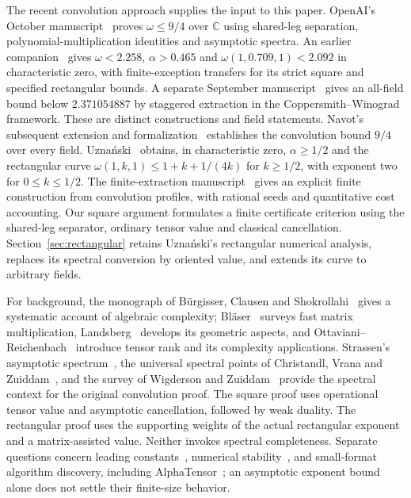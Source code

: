 \documentclass[11pt,letterpaper]{article}
\theoremstyle{definition}
\numberwithin{equation}{section}
\begin{document}
The recent convolution approach supplies the input to this paper. OpenAI's October manuscript~\cite{OpenAI} proves $\omega\leq9/4$ over $\mathbb C$ using shared-leg separation, polynomial-multiplication identities and asymptotic spectra. An earlier companion~\cite{OpenAIRect26} gives $\omega<2.258$, $\alpha>0.465$ and $\omega(1,0.709,1)<2.092$ in characteristic zero, with finite-exception transfers for its strict square and specified rectangular bounds. A separate September manuscript~\cite{OpenAIStaggered26} gives an all-field bound below $2.371054887$ by staggered extraction in the Coppersmith--Winograd framework. These are distinct constructions and field statements. Navot's subsequent extension and formalization~\cite{Navot26,NavotNote26} establishes the convolution bound $9/4$ over every field. Uzna\'nski~\cite{Uznanski26} obtains, in characteristic zero, $\alpha\geq1/2$ and the rectangular curve $\omega(1,k,1)\leq1+k+1/(4k)$ for $k\geq1/2$, with exponent two for $0\leq k\leq1/2$. The finite-extraction manuscript~\cite{Extraction} gives an explicit finite construction from convolution profiles, with rational seeds and quantitative cost accounting. Our square argument formulates a finite certificate criterion using the shared-leg separator, ordinary tensor value and classical cancellation. Section~\ref{sec:rectangular} retains Uzna\'nski's rectangular numerical analysis, replaces its spectral conversion by oriented value, and extends its curve to arbitrary fields.

For background, the monograph of B\"urgisser, Clausen and Shokrollahi~\cite{BCS97} gives a systematic account of algebraic complexity; Bl\"aser~\cite{Blaeser13} surveys fast matrix multiplication, Landsberg~\cite{Landsberg17} develops its geometric aspects, and Ottaviani--Reichenbach~\cite{OR22} introduce tensor rank and its complexity applications. Strassen's asymptotic spectrum~\cite{Str88}, the universal spectral points of Christandl, Vrana and Zuiddam~\cite{CVZ}, and the survey of Wigderson and Zuiddam~\cite{WZ26} provide the spectral context for the original convolution proof. The square proof uses operational tensor value and asymptotic cancellation, followed by weak duality. The rectangular proof uses the supporting weights of the actual rectangular exponent and a matrix-assisted value. Neither invokes spectral completeness. Separate questions concern leading constants~\cite{AY25}, numerical stability~\cite{DDHK07}, and small-format algorithm discovery, including AlphaTensor~\cite{AlphaTensor22}; an asymptotic exponent bound alone does not settle their finite-size behavior.
\end{document}
